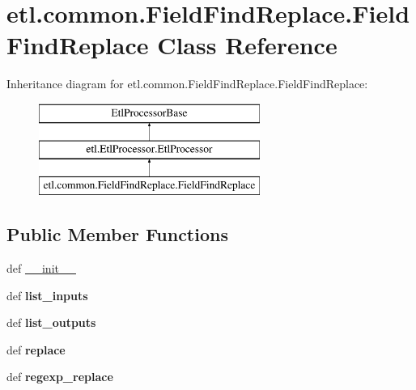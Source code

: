 \hypertarget{classetl_1_1common_1_1FieldFindReplace_1_1FieldFindReplace}{\section{etl.\-common.\-Field\-Find\-Replace.\-Field\-Find\-Replace Class Reference}
\label{classetl_1_1common_1_1FieldFindReplace_1_1FieldFindReplace}
}
Inheritance diagram for etl.\-common.\-Field\-Find\-Replace.\-Field\-Find\-Replace\-:\begin{figure}[H]
\begin{center}
\leavevmode
\includegraphics[height=3.000000cm]{classetl_1_1common_1_1FieldFindReplace_1_1FieldFindReplace}
\end{center}
\end{figure}
\subsection*{Public Member Functions}
\begin{DoxyCompactItemize}
\item 
def \hyperlink{classetl_1_1common_1_1FieldFindReplace_1_1FieldFindReplace_a06f3be0d398ee60bb5093e4d7b0ddc3e}{\-\_\-\-\_\-init\-\_\-\-\_\-}
\item 
\hypertarget{classetl_1_1common_1_1FieldFindReplace_1_1FieldFindReplace_a62b2e0343c81a6f1bd90ac8c8bdf3960}{def {\bfseries list\-\_\-inputs}}\label{classetl_1_1common_1_1FieldFindReplace_1_1FieldFindReplace_a62b2e0343c81a6f1bd90ac8c8bdf3960}

\item 
\hypertarget{classetl_1_1common_1_1FieldFindReplace_1_1FieldFindReplace_a75c72247a400b1a334c299528a6a516a}{def {\bfseries list\-\_\-outputs}}\label{classetl_1_1common_1_1FieldFindReplace_1_1FieldFindReplace_a75c72247a400b1a334c299528a6a516a}

\item 
\hypertarget{classetl_1_1common_1_1FieldFindReplace_1_1FieldFindReplace_aa9906be4a043348c4f9927ab36b40d51}{def {\bfseries replace}}\label{classetl_1_1common_1_1FieldFindReplace_1_1FieldFindReplace_aa9906be4a043348c4f9927ab36b40d51}

\item 
\hypertarget{classetl_1_1common_1_1FieldFindReplace_1_1FieldFindReplace_a50191dec5b9fdfa441437d7d3bc37f4b}{def {\bfseries regexp\-\_\-replace}}\label{classetl_1_1common_1_1FieldFindReplace_1_1FieldFindReplace_a50191dec5b9fdfa441437d7d3bc37f4b}

\end{DoxyCompactItemize}
